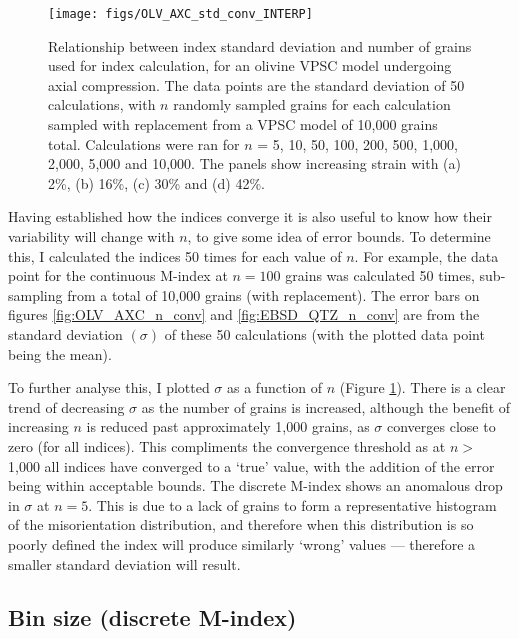 \documentclass[a4paper,12pt,twoside]{report}
\numberwithin{equation}{chapter}
\begin{document}
      
\begin{figure}[h!]
  \centering
    \texttt{[image: figs/OLV\_AXC\_std\_conv\_INTERP]}
  \caption[Index error with no. grains (olivine)]{Relationship between index standard deviation and number of grains used for index calculation, for an olivine VPSC model undergoing axial compression. The data points are the standard deviation of 50 calculations, with $n$ randomly sampled grains for each calculation sampled with replacement from a VPSC model of 10,000 grains total. Calculations were ran for $n$ = 5, 10, 50, 100, 200, 500, 1,000, 2,000, 5,000 and 10,000. The panels show increasing strain with (a) 2\%, (b) 16\%, (c) 30\% and (d) 42\%.}
  \label{fig:OLV_AXC_n_conv_err}
\end{figure}


Having established how the indices converge it is also useful to know how their variability will change with $n$, to give some idea of error bounds. To determine this, I calculated the indices 50 times for each value of $n$. For example, the data point for the continuous M-index at $n = 100$ grains was calculated 50 times, sub-sampling from a total of 10,000 grains (with replacement). The error bars on figures \ref{fig:OLV_AXC_n_conv} and \ref{fig:EBSD_QTZ_n_conv} are from the standard deviation $(\sigma)$ of these 50 calculations (with the plotted data point being the mean).

To further analyse this, I plotted $\sigma$ as a function of $n$ (Figure \ref{fig:OLV_AXC_n_conv_err}). There is a clear trend of decreasing $\sigma$ as the number of grains is increased, although the benefit of increasing $n$ is reduced past approximately 1,000 grains, as $\sigma$ converges close to zero (for all indices). This compliments the convergence threshold as at $n >$ 1,000 all indices have converged to a \lq{}true\rq{} value, with the addition of the error being within acceptable bounds. The discrete M-index shows an anomalous drop in $\sigma$ at $n = 5$. This is due to a lack of grains to form a representative histogram of the misorientation distribution, and therefore when this distribution is so poorly defined the index will produce similarly \lq{}wrong\rq{} values --- therefore a smaller standard deviation will result.

\subsection{Bin size (discrete M-index)} \label{sec:bin_size}
\end{document}
